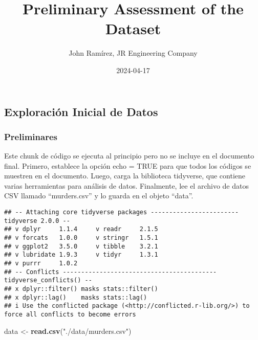 \documentclass[
]{article}
\title{Preliminary Assessment of the Dataset}
\author{John Ramírez, JR Engineering Company}
\date{2024-04-17}
\newenvironment{Shaded}{\begin{snugshade}}{\end{snugshade}}
\newcommand{\AttributeTok}[1]{\textcolor[rgb]{0.13,0.29,0.53}{#1}}
\newcommand{\ConstantTok}[1]{\textcolor[rgb]{0.56,0.35,0.01}{#1}}
\newcommand{\FunctionTok}[1]{\textcolor[rgb]{0.13,0.29,0.53}{\textbf{#1}}}
\newcommand{\NormalTok}[1]{#1}
\newcommand{\OtherTok}[1]{\textcolor[rgb]{0.56,0.35,0.01}{#1}}
\newcommand{\SpecialCharTok}[1]{\textcolor[rgb]{0.81,0.36,0.00}{\textbf{#1}}}
\newcommand{\StringTok}[1]{\textcolor[rgb]{0.31,0.60,0.02}{#1}}
\begin{document}
\maketitle

\hypertarget{exploraciuxf3n-inicial-de-datos}{%
\subsection{Exploración Inicial de
Datos}\label{exploraciuxf3n-inicial-de-datos}}

\hypertarget{preliminares}{%
\subsubsection{Preliminares}\label{preliminares}}

Este chunk de código se ejecuta al principio pero no se incluye en el
documento final. Primero, establece la opción echo = TRUE para que todos
los códigos se muestren en el documento. Luego, carga la biblioteca
tidyverse, que contiene varias herramientas para análisis de datos.
Finalmente, lee el archivo de datos CSV llamado ``murders.csv'' y lo
guarda en el objeto ``data''.

\begin{Shaded}
\end{Shaded}

\begin{verbatim}
## -- Attaching core tidyverse packages ------------------------ tidyverse 2.0.0 --
## v dplyr     1.1.4     v readr     2.1.5
## v forcats   1.0.0     v stringr   1.5.1
## v ggplot2   3.5.0     v tibble    3.2.1
## v lubridate 1.9.3     v tidyr     1.3.1
## v purrr     1.0.2     
## -- Conflicts ------------------------------------------ tidyverse_conflicts() --
## x dplyr::filter() masks stats::filter()
## x dplyr::lag()    masks stats::lag()
## i Use the conflicted package (<http://conflicted.r-lib.org/>) to force all conflicts to become errors
\end{verbatim}

\begin{Shaded}
\begin{Highlighting}[]
\NormalTok{data }\OtherTok{\textless{}{-}} \FunctionTok{read.csv}\NormalTok{(}\StringTok{"./data/murders.csv"}\NormalTok{)}
\end{Highlighting}
\end{Shaded}
\end{document}
